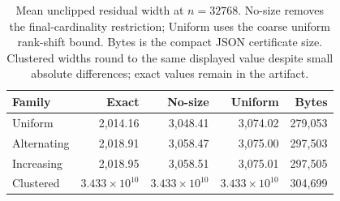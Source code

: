 \begin{table}[t]
\caption{Mean unclipped residual width at $n=32768$. No-size removes the final-cardinality restriction; Uniform uses the coarse uniform rank-shift bound. Bytes is the compact JSON certificate size. Clustered widths round to the same displayed value despite small absolute differences; exact values remain in the artifact.}
\label{tab:width}
\begin{tabular}{lrrrr}
\toprule
Family & Exact & No-size & Uniform & Bytes\\
\midrule
Uniform & 2,014.16 & 3,048.41 & 3,074.02 & 279,053 \\
Alternating & 2,018.91 & 3,058.47 & 3,075.00 & 297,503 \\
Increasing & 2,018.95 & 3,058.51 & 3,075.01 & 297,505 \\
Clustered & $3.433\times10^{10}$ & $3.433\times10^{10}$ & $3.433\times10^{10}$ & 304,699 \\
\bottomrule
\end{tabular}
\end{table}

